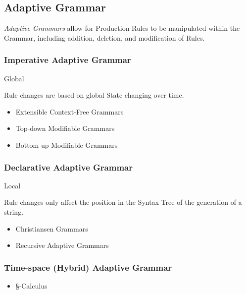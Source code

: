 \subsection{Adaptive Grammar}\label{sec:adaptive_grammar}

\emph{Adaptive Grammars} allow for Production Rules to be manipulated
within the Grammar, including addition, deletion, and modification of
Rules.



\subsubsection{Imperative Adaptive Grammar}

Global

Rule changes are based on global State changing over time.

\begin{itemize}
\item Extensible Context-Free Grammars
\item Top-down Modifiable Grammars
\item Bottom-up Modifiable Grammars
\end{itemize}



\subsubsection{Declarative Adaptive Grammar}

Local

Rule changes only affect the position in the Syntax Tree of the
generation of a string.

\begin{itemize}
\item Christiansen Grammars
\item Recursive Adaptive Grammars
\end{itemize}



\subsubsection{Time-space (Hybrid) Adaptive Grammar}

\begin{itemize}
\item \S-Calculus
\end{itemize}



